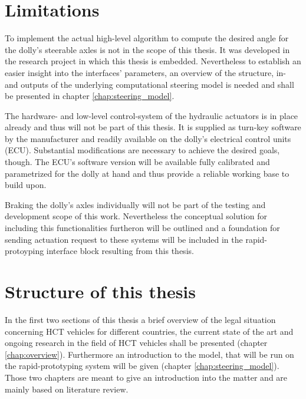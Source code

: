 \documentclass[ExampleMasters.tex]{subfiles}
\begin{document}
\section{Limitations}
\label{sec:limitations}
To implement the actual high-level algorithm to compute the desired angle for the dolly's steerable axles is not in the scope of this thesis. It was developed in the research project in which this thesis is embedded. Nevertheless to establish an easier insight into the interfaces' parameters, an overview of the structure, in- and outputs of the underlying computational steering model is needed and shall be presented in chapter \ref{chap:steering_model}. 

The hardware- and low-level control-system of the hydraulic actuators is in place already and thus will not be part of this thesis. It is supplied as turn-key software by the manufacturer and readily available on the dolly's electrical control units (ECU). Substantial modifications are necessary to achieve the desired goals, though. The ECU's software version will be available fully calibrated and parametrized for the dolly at hand and thus provide a reliable working base to build upon. 

Braking the dolly's axles individually will not be part of the testing and development scope of this work. Nevertheless the conceptual solution for including this functionalities furtheron will be outlined and a foundation for sending actuation request to these systems will be included in the rapid-protoyping interface block resulting from this thesis. 


\section{Structure of this thesis}
\label{sec:structure}

In the first two sections of this thesis a brief overview of the legal situation concerning HCT vehicles for different countries, the current state of the art and ongoing research in the field of HCT vehicles shall be presented (chapter \ref{chap:overview}). Furthermore an introduction to the model, that will be run on the rapid-prototyping system will be given (chapter \ref{chap:steering_model}). Those two chapters are meant to give an introduction into the matter and are mainly based on literature review. 
\end{document}
